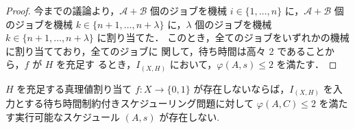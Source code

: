 \documentclass[12pt]{optlab-bachelor}
\begin{document}
\begin{proof}
  今までの議論より，$\mathcal{A} + \mathcal{B}$ 個のジョブを機械 $i \in
  \{1,\ldots,n\}$ に，$\mathcal{A} + \mathcal{B}$ 個のジョブを機械 $k \in\{n + 1, \ldots, n + \lambda\}$ に，$\lambda$ 個のジョブを機械 $k \in\{n + 1, \ldots, n + \lambda\}$ に割り当てた．
  このとき，全てのジョブをいずれかの機械に割り当てており，全てのジョブに
  関して，待ち時間は高々 2 であることから，$f$ が $H$ を充足す
  るとき，$I_{(X,H)}$ において，$\varphi(A,s) \le 2$ を満たす．
\end{proof}

\begin{lemma}\label{l_7}
  $H$ を充足する真理値割り当て $f : X \to \{0,1\}$ が存在しないならば，$I_{(X,H)}$ を入力とする待ち時間制約付きスケジューリング問題に対して $\varphi(A, C) \le 2$ を満たす実行可能なスケジュール $(A,s)$ が存在しない.
\end{lemma}
\end{document}
